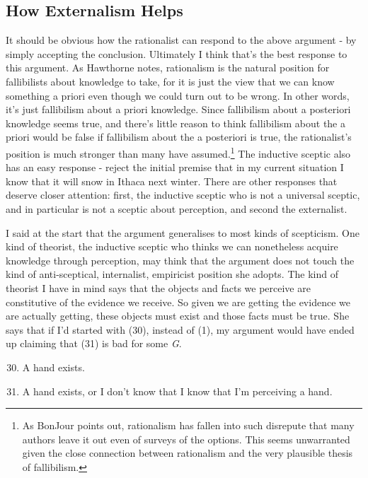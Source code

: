 \hypertarget{how-externalism-helps}{%
\subsection{How Externalism Helps}\label{how-externalism-helps}}

It should be obvious how the rationalist can respond to the above
argument - by simply accepting the conclusion. Ultimately I think that's
the best response to this argument. As Hawthorne notes, rationalism is
the natural position for fallibilists about knowledge to take, for it is
just the view that we can know something a priori even though we could
turn out to be wrong. In other words, it's just fallibilism about a
priori knowledge. Since fallibilism about a posteriori knowledge seems
true, and there's little reason to think fallibilism about the a priori
would be false if fallibilism about the a posteriori is true, the
rationalist's position is much stronger than many have
assumed.\footnote{As BonJour points out, rationalism has fallen into
  such disrepute that many authors leave it out even of surveys of the
  options. This seems unwarranted given the close connection between
  rationalism and the very plausible thesis of fallibilism.} The
inductive sceptic also has an easy response - reject the initial premise
that in my current situation I know that it will snow in Ithaca next
winter. There are other responses that deserve closer attention: first,
the inductive sceptic who is not a universal sceptic, and in particular
is not a sceptic about perception, and second the externalist.

I said at the start that the argument generalises to most kinds of
scepticism. One kind of theorist, the inductive sceptic who thinks we
can nonetheless acquire knowledge through perception, may think that the
argument does not touch the kind of anti-sceptical, internalist,
empiricist position she adopts. The kind of theorist I have in mind says
that the objects and facts we perceive are constitutive of the evidence
we receive. So given we are getting the evidence we are actually
getting, these objects must exist and those facts must be true. She says
that if I'd started with (30), instead of (1), my argument would have
ended up claiming that (31) is bad for some \emph{G}.

\begin{enumerate}
\setcounter{enumi}{29}
\item
  A hand exists.
\item
  A hand exists, or I don't know that I know that I'm perceiving a hand.
\end{enumerate}

